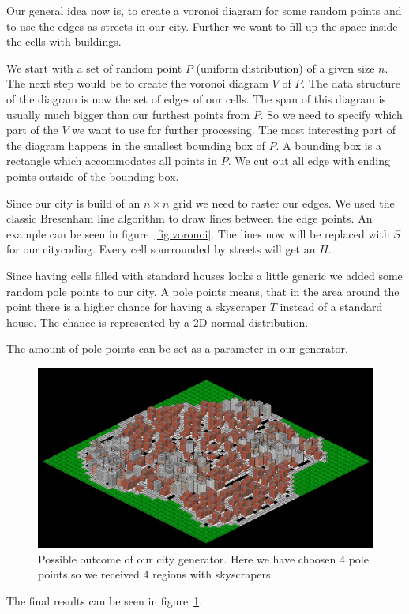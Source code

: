 \documentclass{scrartcl}
\begin{document}
Our general idea now is,  to create a voronoi diagram for some random points
and to use the edges as streets in our city. Further we want to fill up the
space inside the cells with buildings. 

We  start with a set of random point $P$ (uniform distribution) of a given
size $n$. The next step would be to create the voronoi diagram $V$ of $P$.
The data structure of the diagram is now the set of edges of our cells.
The span of this diagram is usually much bigger than our furthest points from $P$.
So we need to specify which part of the $V$ we want to use for further processing.
The most interesting part of the diagram happens in the smallest bounding
box of $P$. A bounding box is a rectangle which
accommodates all points in $P$. We cut out all edge with ending points outside
of the bounding box.

Since our city is build of an $n\times n$ grid we need to raster our edges.
We used the classic Bresenham line algorithm to draw lines between the edge points.
An example can be seen in figure~\ref{fig:voronoi}.
The lines now will be replaced with $S$ for our citycoding. Every cell sourrounded
by streets will get an $H$.

Since having cells filled with standard houses looks a little
generic we added some random pole points to our city.
A pole points means, that in the area around the point there is a higher chance
for having a skyscraper $T$ instead of a standard house. The chance is represented
by a 2D-normal distribution.

The amount of pole points can be set as a parameter in our generator.

\begin{figure}
    \centering
    \includegraphics[scale = 1.2]{city1}
    \caption{Possible outcome of our city generator. Here we have choosen 4 pole
    points so we received 4 regions with skyscrapers.}
    \label{fig:city_example}
\end{figure}

The final results can be seen in figure~\ref{fig:city_example}.
\end{document}
